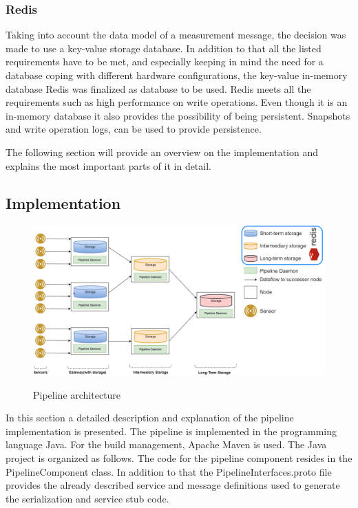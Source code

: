 \subsubsection{Redis}
Taking into account the data model of a measurement message, the decision was made to use a key-value storage database. In addition to that all the listed requirements have to be met, and especially keeping in mind the need for a database coping with different hardware configurations, the key-value in-memory database Redis was finalized as database to be used.
Redis meets all the requirements such as high performance on write operations. Even though it is an in-memory database it also provides the possibility of being persistent. Snapshots and write operation logs, can be used to provide persistence. 

The following section will provide an overview on the implementation and explains the most important parts of it in detail.
\subsection{Implementation}

\begin{figure}[h]
\centering
\includegraphics[width=\linewidth]{figures/pipelinearchitecture.png}\\
\caption{Pipeline architecture}
\label{pipeline_arch}
\end{figure}
In this section a detailed description and explanation of the pipeline implementation is presented. The pipeline is implemented in the programming language Java. For the build management, Apache Maven is used. The Java project is organized as follows. The code for the pipeline component resides in the PipelineComponent class. In addition to that the PipelineInterfaces.proto file provides the already described service and message definitions used to generate the serialization and service stub code. 


